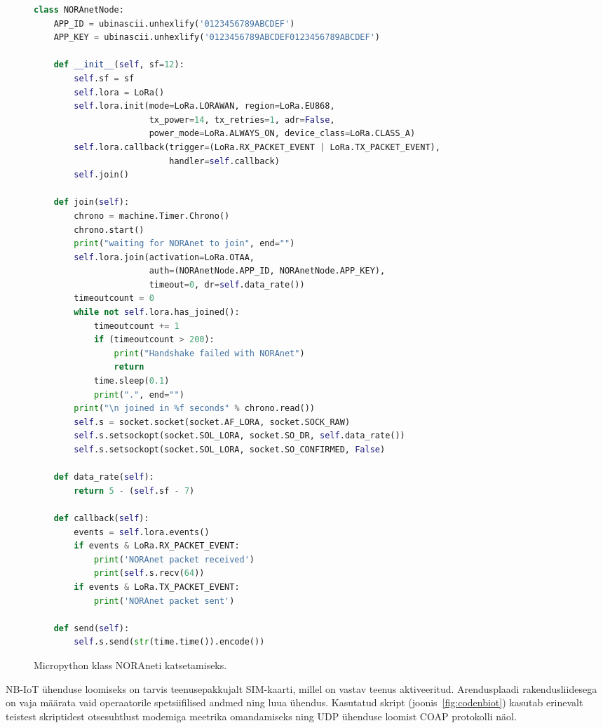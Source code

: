 \documentclass[12pt]{article}
\begin{document}
    \begin{figure}[h]
        \begin{spacing}{0.8}
            \begin{lstlisting}[language=Python]
class NORAnetNode:
    APP_ID = ubinascii.unhexlify('0123456789ABCDEF')
    APP_KEY = ubinascii.unhexlify('0123456789ABCDEF0123456789ABCDEF')

    def __init__(self, sf=12):
        self.sf = sf
        self.lora = LoRa()
        self.lora.init(mode=LoRa.LORAWAN, region=LoRa.EU868,
                       tx_power=14, tx_retries=1, adr=False,
                       power_mode=LoRa.ALWAYS_ON, device_class=LoRa.CLASS_A)
        self.lora.callback(trigger=(LoRa.RX_PACKET_EVENT | LoRa.TX_PACKET_EVENT),
                           handler=self.callback)
        self.join()

    def join(self):
        chrono = machine.Timer.Chrono()
        chrono.start()
        print("waiting for NORAnet to join", end="")
        self.lora.join(activation=LoRa.OTAA,
                       auth=(NORAnetNode.APP_ID, NORAnetNode.APP_KEY),
                       timeout=0, dr=self.data_rate())
        timeoutcount = 0
        while not self.lora.has_joined():
            timeoutcount += 1
            if (timeoutcount > 200):
                print("Handshake failed with NORAnet")
                return
            time.sleep(0.1)
            print(".", end="")
        print("\n joined in %f seconds" % chrono.read())
        self.s = socket.socket(socket.AF_LORA, socket.SOCK_RAW)
        self.s.setsockopt(socket.SOL_LORA, socket.SO_DR, self.data_rate())
        self.s.setsockopt(socket.SOL_LORA, socket.SO_CONFIRMED, False)

    def data_rate(self):
        return 5 - (self.sf - 7)

    def callback(self):
        events = self.lora.events()
        if events & LoRa.RX_PACKET_EVENT:
            print('NORAnet packet received')
            print(self.s.recv(64))
        if events & LoRa.TX_PACKET_EVENT:
            print('NORAnet packet sent')

    def send(self):
        self.s.send(str(time.time()).encode())
            \end{lstlisting}
        \end{spacing}
        \caption{Micropython klass NORAneti katsetamiseks.}
        \label{fig:codenoranet}
    \end{figure}

    NB-IoT ühenduse loomiseks on tarvis teenusepakkujalt SIM-kaarti, millel on vastav teenus aktiveeritud.
    Arendusplaadi rakendusliidesega on vaja määrata vaid operaatorile spetsiifilised andmed ning luua ühendus.
    Kasutatud skript (joonis~\ref{fig:codenbiot}) kasutab erinevalt teistest skriptidest otsesuhtlust modemiga meetrika omandamiseks ning UDP ühenduse loomist COAP protokolli näol.
    \newpage
\end{document}
